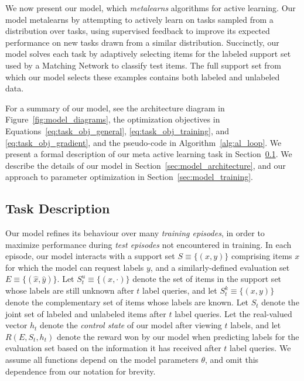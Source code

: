 
We now present our model, which \emph{metalearns} algorithms for active learning. Our model metalearns by attempting to actively learn on tasks sampled from a distribution over tasks, using supervised feedback to improve its expected performance on new tasks drawn from a similar distribution.
Succinctly, our model solves each task by adaptively selecting items for the labeled support set used by a Matching Network \cite{vinyals2016matching} to classify test items.
The full support set from which our model selects these examples contains both labeled and unlabeled data.

For a summary of our model, see the architecture diagram in Figure~\ref{fig:model_diagrams}, the optimization objectives in Equations~\ref{eq:task_obj_general}, \ref{eq:task_obj_training}, and \ref{eq:task_obj_gradient}, and the pseudo-code in Algorithm~\ref{alg:al_loop}. We present a formal description of our meta active learning task in Section~\ref{sec:model_task}. We describe the details of our model in Section~\ref{sec:model_architecture}, and our approach to parameter optimization in Section~\ref{sec:model_training}.


\subsection{Task Description}
\label{sec:model_task}

Our model refines its behaviour over many \emph{training episodes}, in order to maximize performance during \emph{test episodes} not encountered in training.
In each episode, our model interacts with a support set $S \equiv \{(x, y)\}$ comprising items $x$ for which the model can request labels $y$, and a similarly-defined evaluation set $E \equiv \{(\hat x, \hat y)\}$.
Let $S^u_t \equiv \{(x, \cdot)\}$ denote the set of items in the support set whose labels are still unknown after $t$ label queries, and let $S^k_t \equiv \{(x, y)\}$ denote the complementary set of items whose labels are known.
Let $S_t$ denote the joint set of labeled and unlabeled items after $t$ label queries.
Let the real-valued vector $h_t$ denote the \emph{control state} of our model after viewing $t$ labels, and let $R(E, S_t, h_t)$ denote the reward won by our model when predicting labels for the evaluation set based on the information it has received after $t$ label queries. We assume all functions depend on the model parameters $\theta$, and omit this dependence from our notation for brevity.

